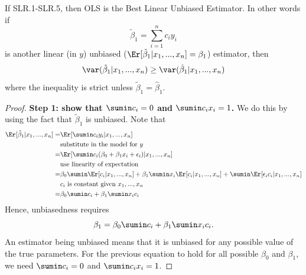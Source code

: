 \begin{theorem} 
  If SLR.1-SLR.5, then OLS is the \alert{B}est \alert{L}inear
  \alert{U}nbiased \alert{E}stimator. In other words if 
  \[ \tilde{\beta}_1 = \sum_{i=1}^n c_i y_i \]
  is another linear (in $y$) unbiased ($\Er[\tilde{\beta}_1|x_1, ..., x_n] = \beta_1$)
  estimator, then 
  \[ \var(\tilde{\beta}_1 | x_1, ..., x_n) \geq \var(\hat{\beta}_1 |
  x_1, ..., x_n) \]
  where the inequality is strict unless $\tilde{\beta}_1 = \hat{\beta}_1$.
\end{theorem}
\begin{proof}  
  \textbf{Step 1: show that $\sumin c_i = 0$ and $\sumin c_i x_i =
    1$.} We do this by using the fact that $\tilde{\beta}_1$ is
  unbiased. Note that 
  \begin{align*}
    \Er[\tilde{\beta}_1|x_1, ..., x_n] = & \Er[\sumin c_i y_i |x_1,
                                           ..., x_n] \\
    & \text{substitute in the model for $y$} \\
    = & \Er[\sumin c_i (\beta_0 + \beta_1 x_i + \epsilon_i)|x_1, ..., x_n ] \\
    & \text{use linearity of expectation} \\
    = & \beta_0 \sumin \Er[c_i | x_1, ..., x_n] + \beta_1 \sumin x_i
        \Er[c_i | x_1, ..., x_n]  + \sumin \Er[\epsilon_i c_i | x_1,
        ... , x_n] \\
    & \text{$c_i$ is constant given $x_1, ... , x_n$} \\
    = & \beta_0 \sumin c_i + \beta_1 \sumin x_i c_i \\    
  \end{align*}
  Hence, unbiasedness requires 
  \[ \beta_1 = \beta_0 \sumin c_i + \beta_1 \sumin x_i c_i.  \]
  An estimator being unbiased means that it is unbiased for any
  possible value of the true parameters. For the previous equation to
  hold for all possible $\beta_0$ and $\beta_1$, we need $\sumin c_i =
  0$ and $\sumin c_i x_i = 1$.
  

\end{proof}
